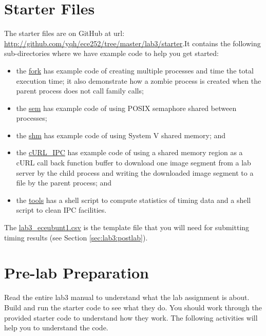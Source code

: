 \section{Starter Files}
The starter files are on GitHub at url: \url{http://github.com/yqh/ece252/tree/master/lab3/starter}.It contains the following sub-directories where we have example code to help you get started:
\begin{itemize}
\item the \href{http://github.com/yqh/ece252/tree/master/lab3/starter/fork}{fork} has example code of creating multiple processes and time the total execution time;
  it also demonstrate how a zombie process is created when the parent process does not call  family calls;
\item the \href{http://github.com/yqh/ece252/tree/master/lab3/starter/sem}{sem} has example code of using POSIX semaphore shared between processes;
\item the \href{http://github.com/yqh/ece252/tree/master/lab3/starter/shm}{shm} has example code of using System V shared memory; and
\item the \href{http://github.com/yqh/ece252/tree/master/lab3/starter/cURL_IPC}{cURL\_IPC} has example code of using a shared memory region as a cURL call back function buffer to download one image segment from a lab server by the child process and writing the downloaded image segment to a file by the parent process; and
\item the \href{http://github.com/yqh/ece252/tree/master/lab3/starter/tools}{tools} has a shell script to compute statistics of timing data and a shell script to clean IPC facilities.
\end{itemize}
The \href{http://github.com/yqh/ece252/tree/master/lab3/starter/lab3_eceubuntu1.csv}{lab3\_eceubunt1.csv} is the template file that you will need for submitting timing results (see Section \ref{sec:lab3:postlab}).
\section{Pre-lab Preparation}
Read the entire lab3 manual to understand what the lab assignment is about. Build and run the starter code to see what they do. You should work through the provided starter code to understand how they work. The following activities will help you to understand the code.

